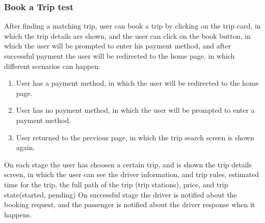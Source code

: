 \documentclass[a4paper, 12pt]{report} %
\begin{document}
                \subsubsection{Book a Trip test}
                After finding a matching trip, user can book a trip by clicking on the trip card, in which the trip details are shown, and the user can click on the book button, in which the user will be prompted to enter his payment method, and after successful payment the user will be redirected to the home page.
                in which different scenarios can happen:
                \begin{enumerate}
                    \item User has a payment method, in which the user will be redirected to the home page.
                    \item User has no payment method, in which the user will be prompted to enter a payment method.
                    \item User returned to the previous page, in which the trip search screen is shown again.
                \end{enumerate}
                On each stage the user has choosen a certain trip, and is shown the trip details screen, in which the user can see the driver information, and trip rules, estimated time for the trip, the full path of the trip (trip stations), price, and trip state(started, pending)
                On successful stage the driver is notified about the booking request, and the passenger is notified about the driver response when it happens.
\end{document}

